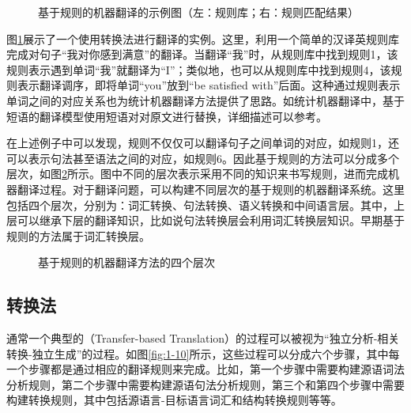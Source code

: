 \begin{figure}[htp]
    \centering

    \caption{基于规则的机器翻译的示例图（左：规则库；右：规则匹配结果）}
    \label{fig:1-8}
\end{figure}

\parinterval 图\ref{fig:1-8}展示了一个使用转换法进行翻译的实例。这里，利用一个简单的汉译英规则库完成对句子“我对你感到满意”的翻译。当翻译“我”时，从规则库中找到规则1，该规则表示遇到单词“我”就翻译为“I”；类似地，也可以从规则库中找到规则4，该规则表示翻译调序，即将单词“you”放到“be satisfied with”后面。这种通过规则表示单词之间的对应关系也为统计机器翻译方法提供了思路。如统计机器翻译中，基于短语的翻译模型使用短语对对原文进行替换，详细描述可以参考{\chapterseven}。

\parinterval 在上述例子中可以发现，规则不仅仅可以翻译句子之间单词的对应，如规则1，还可以表示句法甚至语法之间的对应，如规则6。因此基于规则的方法可以分成多个层次，如图\ref{fig:1-9}所示。图中不同的层次表示采用不同的知识来书写规则，进而完成机器翻译过程。对于翻译问题，可以构建不同层次的基于规则的机器翻译系统。这里包括四个层次，分别为：词汇转换、句法转换、语义转换和中间语言层。其中，上层可以继承下层的翻译知识，比如说句法转换层会利用词汇转换层知识。早期基于规则的方法属于词汇转换层。

\begin{figure}[htp]
    \centering

    \caption{基于规则的机器翻译方法的四个层次}
\setlength{\belowcaptionskip}{-1.5em}
    \label{fig:1-9}
\end{figure}


\subsection{转换法}

\parinterval 通常一个典型的{\small{}}（Transfer-based Translation）的过程可以被视为“独立分析-相关转换-独立生成”的过程。如图\ref{fig:1-10}所示，这些过程可以分成六个步骤，其中每一个步骤都是通过相应的翻译规则来完成。比如，第一个步骤中需要构建源语词法分析规则，第二个步骤中需要构建源语句法分析规则，第三个和第四个步骤中需要构建转换规则，其中包括源语言-目标语言词汇和结构转换规则等等。

